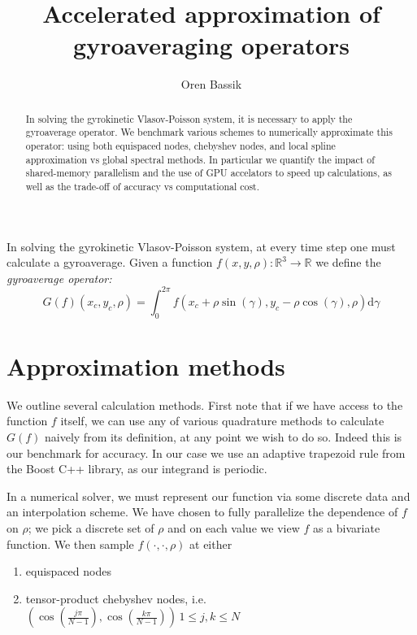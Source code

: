 \documentclass{article}
\theoremstyle{theorem}
\theoremstyle{definition}
\begin{document}
\title{Accelerated approximation of gyroaveraging operators}
\author{Oren Bassik}

\maketitle

\begin{abstract}
In solving the gyrokinetic Vlasov-Poisson system, it is necessary to apply the gyroaverage operator.  We benchmark various schemes to numerically approximate this operator: using both equispaced nodes, chebyshev nodes, and local spline approximation vs global spectral methods.  In particular we quantify the impact of shared-memory parallelism and the use of GPU accelators to speed up calculations, as well as the trade-off of accuracy vs computational cost.  \end{abstract}


\noindent
In solving the gyrokinetic Vlasov-Poisson system, at every time step one must calculate a gyroaverage.  Given a function $f(x,y,\rho) : \mathbb{R}^3 \to \mathbb{R}$ we define the \textit{gyroaverage operator:} 
 \[ G(f)(x_c,y_c,\rho) = \int_0^{2\pi}  f(x_c + \rho \sin(\gamma), y_c - \rho \cos(\gamma), \rho)  \mathrm{d} \gamma\]

\section{Approximation methods}

We outline several calculation methods.  First note that if we have access to the function $f$ itself, we can use any of various quadrature methods to calculate $G(f)$ naively from its definition, at any point we wish to do so.  Indeed this is our benchmark for accuracy.  In our case we use an adaptive trapezoid rule from the Boost C++ library, as our integrand is periodic.

In a numerical solver, we must represent our function via some discrete data and an interpolation scheme.  We have chosen to fully parallelize the dependence of $f$ on $\rho$; we pick a discrete set of $\rho$ and on each value we view $f$ as a bivariate function.  We then sample $f(\cdot, \cdot, \rho)$ at either \begin{enumerate}
	\item equispaced nodes 
	\item tensor-product chebyshev nodes, i.e. $\left(\cos\left(\frac{j\pi}{N-1}\right), \cos\left(\frac{k\pi}{N-1}\right) \right) \, 1 \leq j,k \leq N$
\end{enumerate}
\end{document}
